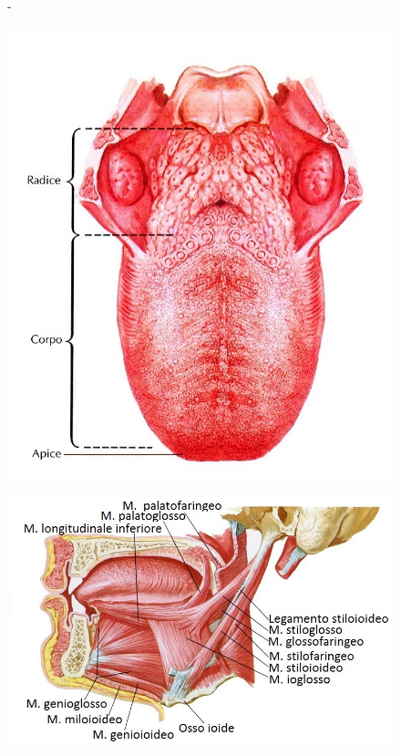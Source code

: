 \begin{figure}[h!]- 
\centering
\begin{minipage}{.36\textwidth}
  \centering
  \includegraphics[scale=0.30]{source/immagini/lingua_anatomia.jpg}
  \label{fig:test1}
\end{minipage}%
\begin{minipage}{.5\textwidth}
  \centering
  \includegraphics[scale=0.33]{source/immagini/muscoli_estrinseci_lingua.jpg}
  \label{fig:test2}
\end{minipage}
\end{figure}
